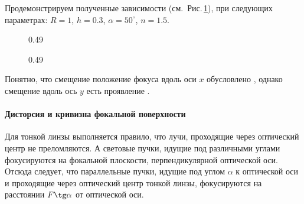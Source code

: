 Продемонстрируем полученные зависимости (см.~Рис.\,\ref{pic:coma}), при следующих параметрах: $R = 1$, $h = 0.3$, $\alpha = 50^\circ$, $n=1.5$.

\begin{figure}[h]
	\begin{subcaptionblock}{0.49\tw}
	\end{subcaptionblock}
	\hfill
	\begin{subcaptionblock}{0.49\tw}
	\end{subcaptionblock}
	\caption{}
	\label{pic:coma}
\end{figure}

Понятно, что смещение положение фокуса вдоль оси $x$ обусловлено , однако смещение вдоль ось $y$ есть проявление .

\paragraph{Дисторсия и кривизна фокальной поверхности}
Для тонкой линзы выполняется правило, что лучи, проходящие через оптический центр не преломляются. А световые пучки, идущие под различными углами фокусируются на фокальной плоскости, перпендикулярной оптической оси. Отсюда следует, что параллельные пучки, идущие под углом $\alpha$ к оптической оси и проходящие через оптический центр тонкой линзы, фокусируются на расстоянии $F \tg \alpha$ от оптической оси. 

